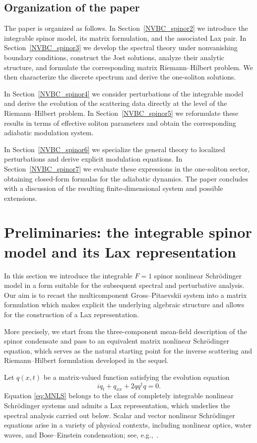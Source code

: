 \documentclass[11pt]{amsart}
\theoremstyle{definition}
\numberwithin{equation}{section}
\begin{document}
\subsection*{Organization of the paper}
The paper is organized as follows. In Section~\ref{NVBC_spinor2} we introduce the integrable spinor model, its matrix formulation, and the associated Lax pair. In Section~\ref{NVBC_spinor3} we develop the spectral theory under nonvanishing boundary conditions, construct the Jost solutions, analyze their analytic structure, and formulate the corresponding matrix Riemann--Hilbert problem. We then characterize the discrete spectrum and derive the one-soliton solutions.

In Section~\ref{NVBC_spinor4} we consider perturbations of the integrable model and derive the evolution of the scattering data directly at the level of the Riemann--Hilbert problem. In Section~\ref{NVBC_spinor5} we reformulate these results in terms of effective soliton parameters and obtain the corresponding adiabatic modulation system.

In Section~\ref{NVBC_spinor6} we specialize the general theory to localized perturbations and derive explicit modulation equations. In Section~\ref{NVBC_spinor7} we evaluate these expressions in the one-soliton sector, obtaining closed-form formulas for the adiabatic dynamics. The paper concludes with a discussion of the resulting finite-dimensional system and possible extensions.
\section{Preliminaries: the integrable spinor model and its Lax representation}
\label{NVBC_spinor1a}

In this section we introduce the integrable $F=1$ spinor nonlinear Schr\"odinger model in a form suitable for the subsequent spectral and perturbative analysis. Our aim is to recast the multicomponent Gross--Pitaevskii system into a matrix formulation which makes explicit the underlying algebraic structure and allows for the construction of a Lax representation.

More precisely, we start from the three-component mean-field description of the spinor condensate and pass to an equivalent matrix nonlinear Schr\"odinger equation, which serves as the natural starting point for the inverse scattering and Riemann--Hilbert formulation developed in the sequel.

Let $q(x,t)$ be a matrix-valued function satisfying the evolution equation
\begin{equation}
i q_t + q_{xx} + 2 q q^\dagger q = 0.
\label{eq:MNLS}
\end{equation}
Equation \eqref{eq:MNLS} belongs to the class of completely integrable nonlinear Schr\"odinger systems and admits a Lax representation, which underlies the spectral analysis carried out below. Scalar and vector nonlinear Schr\"odinger equations arise in a variety of physical contexts, including nonlinear optics, water waves, and Bose--Einstein condensation; see, e.g.,~\cite{AblowitzPrinariTrubatch2004,SulemSulem1999}.
\end{document}
